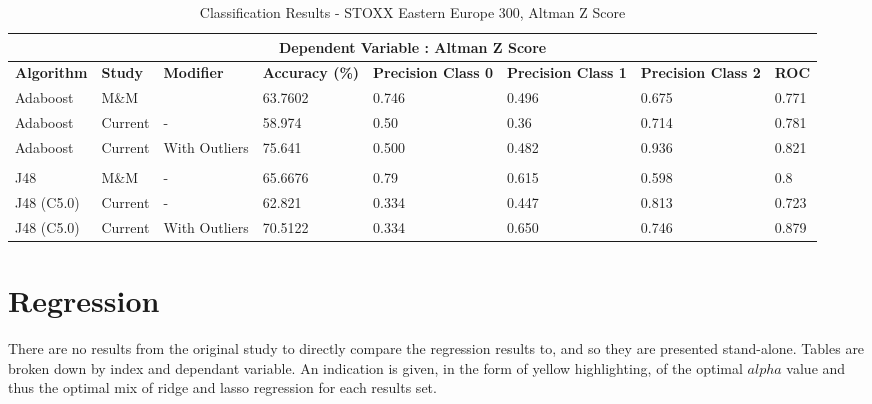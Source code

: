\begin{table}[h]
\centering
\begin{sideways}%
\begin{tabular}{ |p{2.2cm}|p{1.55cm}|p{2.5cm}||p{2cm}|p{2cm}|p{2cm}|p{2cm}|p{1cm}|  }
 \hline
 \multicolumn{8}{|c|}{\bf Dependent Variable : Altman Z Score} \\
 \hline
 {\bf Algorithm} & {\bf Study} & {\bf Modifier} & {\bf Accuracy (\%)} & {\bf Precision Class 0} & {\bf Precision Class 1} &  {\bf Precision Class 2} & {\bf ROC} \\
 \hline
 Adaboost  & M\&M & & 63.7602  & 0.746 &  0.496 & 0.675 & 0.771  \\
   \rowcolor{gray}Adaboost  & Current & - &58.974 & 0.50 & 0.36 & 0.714  & 0.781  \\
 Adaboost  & Current & With Outliers &75.641 & 0.500 & 0.482 &  0.936 & 0.821  \\
   & & & & & & &\\
    \rowcolor{gray}J48  & M\&M & - & 65.6676  & 0.79 &  0.615 & 0.598 & 0.8  \\
  J48 (C5.0) & Current & - &62.821 & 0.334 & 0.447  & 0.813  &  0.723 \\
    \rowcolor{gray}J48 (C5.0) & Current & With Outliers &70.5122 & 0.334 & 0.650  & 0.746 & 0.879  \\
 \hline
\end{tabular}
\end{sideways}
\caption{Classification Results  - STOXX Eastern Europe 300, Altman Z Score}
\end{table}









\clearpage
\section{Regression}\label{S.regression4}
{There are no results from the original study to directly compare the regression results to, and so they are presented stand-alone. Tables are broken down by index and dependant variable.  An indication is given, in the form of yellow highlighting, of the optimal $alpha$ value and thus the optimal mix of ridge and lasso regression for each results set.  }\clearpage

